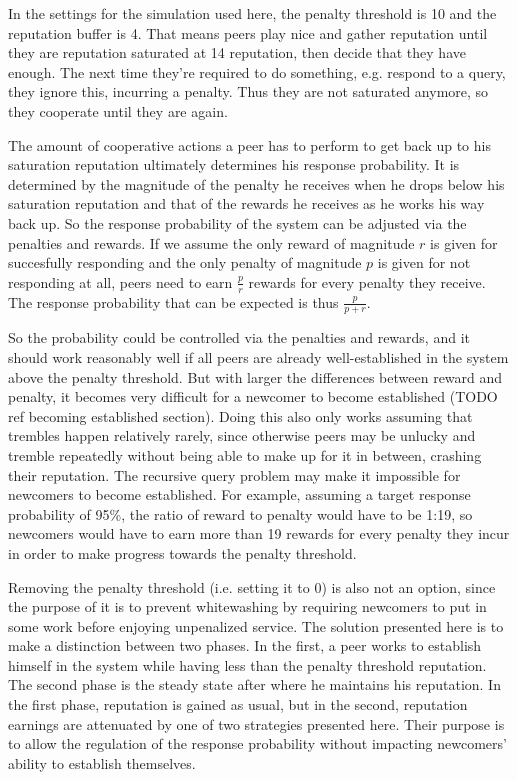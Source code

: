 In the settings for the simulation used here, the penalty threshold is 10 and
the reputation buffer is 4. That means peers play nice and gather reputation
until they are reputation saturated at 14 reputation, then decide that they have
enough. The next time they're required to do something, e.g. respond to a query,
they ignore this, incurring a penalty. Thus they are not saturated anymore, so
they cooperate until they are again.

The amount of cooperative actions a peer has to perform to get back up to his
saturation reputation ultimately determines his response probability. It is
determined by the magnitude of the penalty he receives when he drops below his
saturation reputation and that of the rewards he receives as he works his way
back up. So the response probability of the system can be adjusted via the
penalties and rewards. If we assume the only reward of magnitude $r$ is given
for succesfully responding and the only penalty of magnitude $p$ is given for
not responding at all, peers need to earn $\frac{p}{r}$ rewards for every
penalty they receive. The response probability that can be expected is thus
$\frac{p}{p + r}$.

So the probability could be controlled via the penalties and rewards, and it
should work reasonably well if all peers are already well-established in the
system above the penalty threshold. But with larger the differences between
reward and penalty, it becomes very difficult for a newcomer to become
established (TODO ref becoming established section). Doing this also only works
assuming that trembles happen relatively rarely, since otherwise peers may be
unlucky and tremble repeatedly without being able to make up for it in between,
crashing their reputation. The recursive query problem may make it impossible
for newcomers to become established. For example, assuming a target response
probability of 95\%, the ratio of reward to penalty would have to be 1:19, so
newcomers would have to earn more than 19 rewards for every penalty they incur
in order to make progress towards the penalty threshold.

Removing the penalty threshold (i.e. setting it to 0) is also not an option,
since the purpose of it is to prevent whitewashing by requiring newcomers to put
in some work before enjoying unpenalized service. The solution presented here is
to make a distinction between two phases. In the first, a peer works to
establish himself in the system while having less than the penalty threshold
reputation. The second phase is the steady state after where he maintains his
reputation. In the first phase, reputation is gained as usual, but in the
second, reputation earnings are attenuated by one of two strategies presented
here. Their purpose is to allow the regulation of the response probability
without impacting newcomers' ability to establish themselves.


